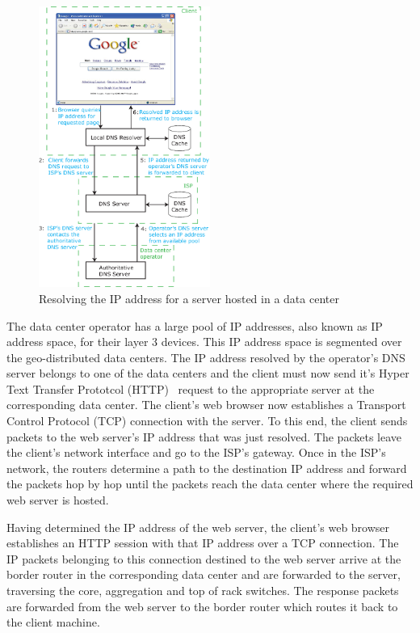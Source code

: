 \begin{figure}
\centering
\includegraphics[width=0.5\textwidth]{pics/dcloadbalance.eps}
\caption{Resolving the IP address for a server hosted in a data center}
\label{fig:dcloadbalance}
\end{figure}

The data center operator has a large pool of IP addresses, also known as IP address space, for their layer 3 devices. This IP address space is segmented over the geo-distributed data centers. The IP address resolved by the operator's DNS server belongs to one of the data centers and the client must now send it's Hyper Text Transfer Prototcol (HTTP)~\cite{rfc1945} request to the appropriate server at the corresponding data center. The client's web browser now establishes a Transport Control Protocol (TCP) connection with the server. To this end, the client sends packets to the web server's IP address that was just resolved. The packets leave the client's network interface and go to the ISP's gateway. Once in the ISP's network, the routers determine a path to the destination IP address and forward the packets hop by hop until the packets reach the data center where the required web server is hosted. 

Having determined the IP address of the web server, the client's web browser establishes an HTTP session with that IP address over a TCP connection. The IP packets belonging to this connection destined to the web server arrive at the border router in the corresponding data center and are forwarded to the server, traversing the core, aggregation and top of rack switches. The response packets are forwarded from the web server to the border router which routes it back to the client machine.


